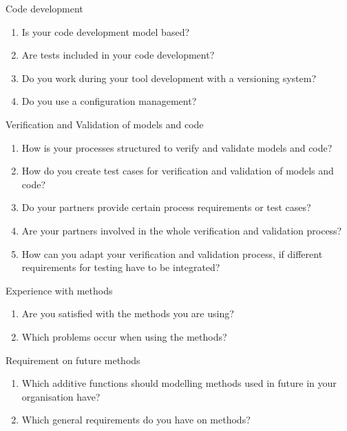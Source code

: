 \documentclass{./template/openetcs_report}
\begin{document}
{\begin{enumerate}
  {\Large \item   Code development}



\begin{enumerate}
  \item  Is your code development model based?
  \item  Are tests included in your code development?
  \item  Do you work during your tool development with a versioning system?
  \item  Do you use a configuration management?
\end{enumerate}

  {\Large \item  Verification and Validation of models and code}

\begin{enumerate}
  \item  How is your processes structured to verify and validate models and code?
  \item  How do you create test cases for verification and validation of models and code?
  \item  Do your partners provide certain process requirements or test cases?
  \item  Are your partners involved in the whole verification and validation process?
  \item  How can you adapt your verification and validation process, if different requirements for testing have to be integrated?
\end{enumerate}

  {\Large \item   Experience with methods}

\begin{enumerate}
  \item  Are you satisfied with the methods you are using?
  \item  Which problems occur when using the methods?
\end{enumerate}


  {\Large \item  Requirement on future methods}

\begin{enumerate}
  \item  Which additive functions should modelling methods used in future in your organisation have?
  \item  Which general requirements do you have on methods?
\end{enumerate}


\end{enumerate}}
\end{document}
